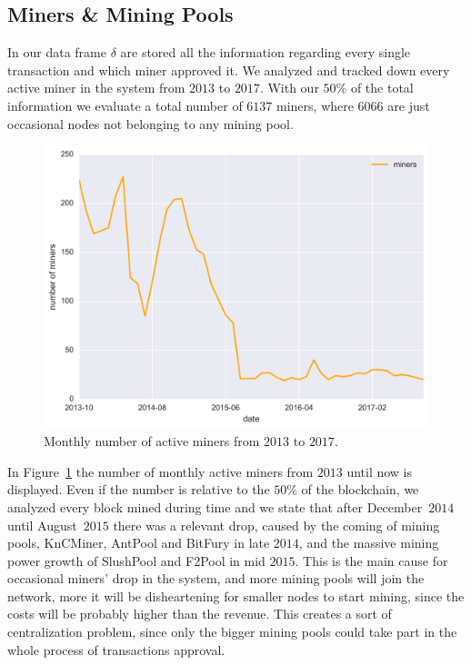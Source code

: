 \documentclass[USenglish]{uit-thesis}
\begin{document}
\subsection{Miners \& Mining Pools}
\label{sec:minersminingpools}
In our data frame $\delta$ are stored all the information regarding
every single transaction and which miner approved it. We analyzed and
tracked down every active miner in the system from $2013$ to $2017$.
With our $50\%$ of the total information we evaluate a total number
of $6137$ miners, where $6066$ are just occasional nodes not belonging
to any mining pool.
\begin{figure}[h]
	\centering
	\includegraphics[width=1\textwidth]{img/number_of_miners}
	\caption{Monthly number of active miners from $2013$ to $2017$.}
	\label{fig:number_of_miners}
\end{figure}
In Figure~\ref{fig:number_of_miners} the number
of monthly active miners from $2013$ until now is displayed.
Even if the number is relative to the $50\%$ of the
blockchain, we analyzed every block mined during time and we state
that after December~$2014$ until August~$2015$
there was a relevant drop, caused by the coming of mining
pools, KnCMiner, AntPool and BitFury in late $2014$, and the massive
mining power growth of SlushPool and F2Pool in mid $2015$.
This is the main cause for occasional miners' drop in the system,
and more mining pools will join the network, more it will be
disheartening for smaller nodes to start mining, since the costs
will be probably higher than the revenue.
This creates a sort of centralization problem, since
only the bigger mining pools could take part in the whole
process of transactions approval.
\end{document}
